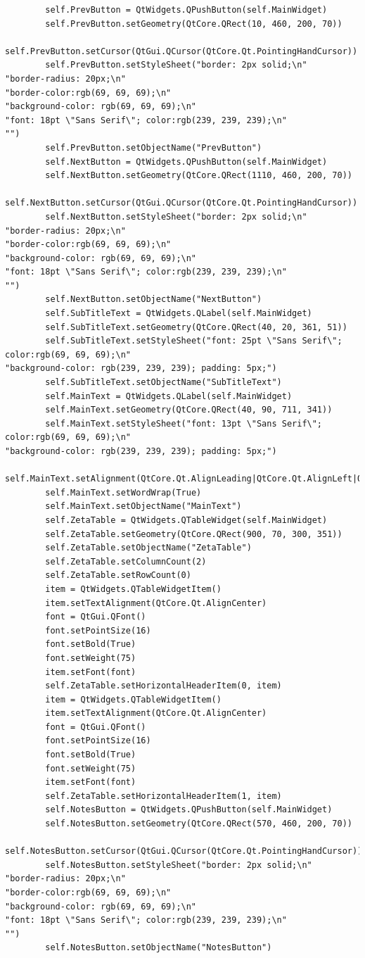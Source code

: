 \documentclass{article}
\begin{document}
\begin{lstlisting}
        self.PrevButton = QtWidgets.QPushButton(self.MainWidget)
        self.PrevButton.setGeometry(QtCore.QRect(10, 460, 200, 70))
        self.PrevButton.setCursor(QtGui.QCursor(QtCore.Qt.PointingHandCursor))
        self.PrevButton.setStyleSheet("border: 2px solid;\n"
"border-radius: 20px;\n"
"border-color:rgb(69, 69, 69);\n"
"background-color: rgb(69, 69, 69);\n"
"font: 18pt \"Sans Serif\"; color:rgb(239, 239, 239);\n"
"")
        self.PrevButton.setObjectName("PrevButton")
        self.NextButton = QtWidgets.QPushButton(self.MainWidget)
        self.NextButton.setGeometry(QtCore.QRect(1110, 460, 200, 70))
        self.NextButton.setCursor(QtGui.QCursor(QtCore.Qt.PointingHandCursor))
        self.NextButton.setStyleSheet("border: 2px solid;\n"
"border-radius: 20px;\n"
"border-color:rgb(69, 69, 69);\n"
"background-color: rgb(69, 69, 69);\n"
"font: 18pt \"Sans Serif\"; color:rgb(239, 239, 239);\n"
"")
        self.NextButton.setObjectName("NextButton")
        self.SubTitleText = QtWidgets.QLabel(self.MainWidget)
        self.SubTitleText.setGeometry(QtCore.QRect(40, 20, 361, 51))
        self.SubTitleText.setStyleSheet("font: 25pt \"Sans Serif\"; color:rgb(69, 69, 69);\n"
"background-color: rgb(239, 239, 239); padding: 5px;")
        self.SubTitleText.setObjectName("SubTitleText")
        self.MainText = QtWidgets.QLabel(self.MainWidget)
        self.MainText.setGeometry(QtCore.QRect(40, 90, 711, 341))
        self.MainText.setStyleSheet("font: 13pt \"Sans Serif\"; color:rgb(69, 69, 69);\n"
"background-color: rgb(239, 239, 239); padding: 5px;")
        self.MainText.setAlignment(QtCore.Qt.AlignLeading|QtCore.Qt.AlignLeft|QtCore.Qt.AlignTop)
        self.MainText.setWordWrap(True)
        self.MainText.setObjectName("MainText")
        self.ZetaTable = QtWidgets.QTableWidget(self.MainWidget)
        self.ZetaTable.setGeometry(QtCore.QRect(900, 70, 300, 351))
        self.ZetaTable.setObjectName("ZetaTable")
        self.ZetaTable.setColumnCount(2)
        self.ZetaTable.setRowCount(0)
        item = QtWidgets.QTableWidgetItem()
        item.setTextAlignment(QtCore.Qt.AlignCenter)
        font = QtGui.QFont()
        font.setPointSize(16)
        font.setBold(True)
        font.setWeight(75)
        item.setFont(font)
        self.ZetaTable.setHorizontalHeaderItem(0, item)
        item = QtWidgets.QTableWidgetItem()
        item.setTextAlignment(QtCore.Qt.AlignCenter)
        font = QtGui.QFont()
        font.setPointSize(16)
        font.setBold(True)
        font.setWeight(75)
        item.setFont(font)
        self.ZetaTable.setHorizontalHeaderItem(1, item)
        self.NotesButton = QtWidgets.QPushButton(self.MainWidget)
        self.NotesButton.setGeometry(QtCore.QRect(570, 460, 200, 70))
        self.NotesButton.setCursor(QtGui.QCursor(QtCore.Qt.PointingHandCursor))
        self.NotesButton.setStyleSheet("border: 2px solid;\n"
"border-radius: 20px;\n"
"border-color:rgb(69, 69, 69);\n"
"background-color: rgb(69, 69, 69);\n"
"font: 18pt \"Sans Serif\"; color:rgb(239, 239, 239);\n"
"")
        self.NotesButton.setObjectName("NotesButton")


\end{lstlisting}
\end{document}
